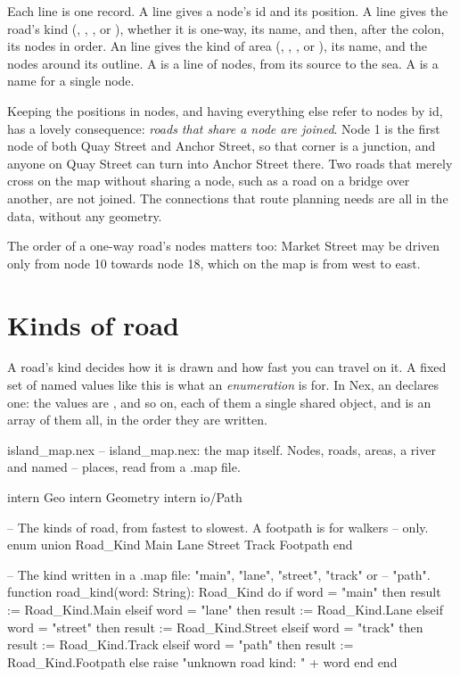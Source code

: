 Each line is one record. A  line gives a node's id and its
position. A  line gives the road's kind (,
, ,  or ), whether it is
one-way, its name, and then, after the colon, its nodes in order. An
 line gives the kind of area (, ,
,  or ), its name, and the nodes around its
outline. A  is a line of nodes, from its source to the sea. A
 is a name for a single node.

Keeping the positions in nodes, and having everything else refer to nodes
by id, has a lovely consequence: \emph{roads that share a node are
joined}. Node 1 is the first node of both Quay Street and Anchor Street,
so that corner is a junction, and anyone on Quay Street can turn into
Anchor Street there. Two roads that merely cross on the map without
sharing a node, such as a road on a bridge over another, are not joined.
The connections that route planning needs are all in the data, without any
geometry.

The order of a one-way road's nodes matters too: Market Street may be
driven only from node 10 towards node 18, which on the map is from west to
east.

\section{Kinds of road}

A road's kind decides how it is drawn and how fast you can travel on it. A
fixed set of named values like this is what an \emph{enumeration} is for.
In Nex, an  declares one: the values are
,  and so on, each of them a
single shared object, and  is an array of them all,
in the order they are written.

\begin{newfile}{island_map.nex}
-- island_map.nex: the map itself. Nodes, roads, areas, a river and named
-- places, read from a .map file.

intern Geo
intern Geometry
intern io/Path

-- The kinds of road, from fastest to slowest. A footpath is for walkers
-- only.
enum union Road_Kind
  Main
  Lane
  Street
  Track
  Footpath
end

-- The kind written in a .map file: "main", "lane", "street", "track" or
-- "path".
function road_kind(word: String): Road_Kind do
  if word = "main" then
    result := Road_Kind.Main
  elseif word = "lane" then
    result := Road_Kind.Lane
  elseif word = "street" then
    result := Road_Kind.Street
  elseif word = "track" then
    result := Road_Kind.Track
  elseif word = "path" then
    result := Road_Kind.Footpath
  else
    raise "unknown road kind: " + word
  end
end
\end{newfile}

